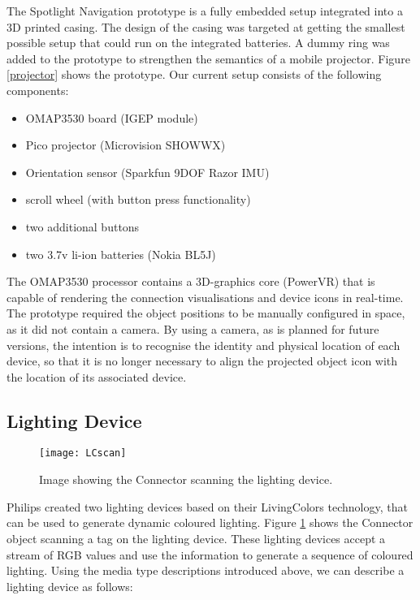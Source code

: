 The Spotlight Navigation prototype is a fully embedded setup integrated into a 3D printed casing. The design of the casing was targeted at getting the smallest possible setup that could run on the integrated batteries. A dummy ring was added to the prototype to strengthen the semantics of a mobile projector. Figure \ref{projector} shows the prototype. Our current setup consists of the following components:

\begin{itemize}
\item OMAP3530 board (IGEP module)
\item Pico projector (Microvision SHOWWX)
\item Orientation sensor (Sparkfun 9DOF Razor IMU)
\item scroll wheel (with button press functionality)
\item two additional buttons
\item two 3.7v li-ion batteries (Nokia BL5J)
\end{itemize}

The OMAP3530 processor contains a 3D-graphics core (PowerVR) that is capable of
rendering the connection visualisations and device icons in real-time. The prototype required the object positions to be manually configured in space, as it did not contain a camera. By using a camera, as is planned for future versions, the intention is to recognise the identity and physical location of each device, so that it is no longer necessary to align the projected object icon with the location of its associated device.


\subsection{Lighting Device}

\begin{figure}
\centering
\texttt{[image: LCscan]}
\caption{Image showing the Connector scanning the lighting device.}
\label{LCscan}
\end{figure}

Philips created two lighting devices based on their LivingColors technology, that can be used to generate dynamic coloured lighting. Figure \ref{LCscan} shows the Connector object scanning a tag on the lighting device. These lighting devices accept a stream of RGB values and use the information to generate a sequence of coloured lighting. Using the media type descriptions introduced above, we can describe a lighting device as follows: 

